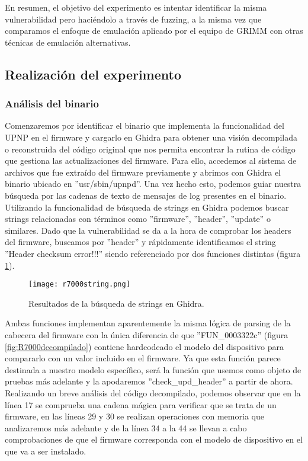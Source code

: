 En resumen, el objetivo del experimento es intentar identificar la misma vulnerabilidad pero haciéndolo a través de fuzzing, a la misma vez que comparamos el enfoque de 
emulación aplicado por el equipo de GRIMM con otras técnicas de emulación alternativas.

\subsection{Realización del experimento}
\subsubsection{Análisis del binario}
Comenzaremos por identificar el binario que implementa la funcionalidad del UPNP en el firmware y cargarlo en Ghidra\cite{Ghidra} para obtener una visión
decompilada o reconstruida del código original que nos permita encontrar la rutina de código que gestiona las actualizaciones del firmware. Para ello, 
accedemos al sistema de archivos que fue extraído del firmware previamente y abrimos con Ghidra el binario ubicado en ''usr/sbin/upnpd''. Una vez 
hecho esto, podemos guiar nuestra búsqueda por las cadenas de texto de mensajes de log presentes en el binario. Utilizando la funcionalidad de búsqueda 
de strings en Ghidra podemos buscar strings relacionadas con términos como ''firmware'', ''header'', ''update'' o similares. Dado que la vulnerabilidad 
se da a la hora de comprobar los headers del firmware, buscamos por ''header'' y rápidamente identificamos el string ''Header checksum error!!!'' 
siendo referenciado por dos funciones distintas (figura \ref{fig:R7000string}).

\begin{figure}[H]
    \centering
    \texttt{[image: r7000string.png]}
    \caption{Resultados de la búsqueda de strings en Ghidra.}
    \label{fig:R7000string}
\end{figure}

Ambas funciones implementan aparentemente la misma lógica de parsing de la cabecera del firmware con la única diferencia de que ''FUN\_0003322c''
(figura \ref{fig:R7000decompilado}) contiene hardcodeado el modelo del dispositivo para compararlo con un valor incluido en el firmware. 
Ya que esta función parece destinada a nuestro modelo específico, será la función que usemos como objeto de pruebas más adelante y la apodaremos 
''check\_upd\_header'' a partir de ahora. Realizando un breve 
análisis del código decompilado, podemos observar que en la línea 17 se comprueba una cadena mágica para verificar que se trata de un firmware, 
en las líneas 29 y 30 se realizan operaciones con memoria que analizaremos más adelante y de la línea 34 a la 44 se llevan a cabo comprobaciones de que 
el firmware corresponda con el modelo de dispositivo en el que va a ser instalado.

